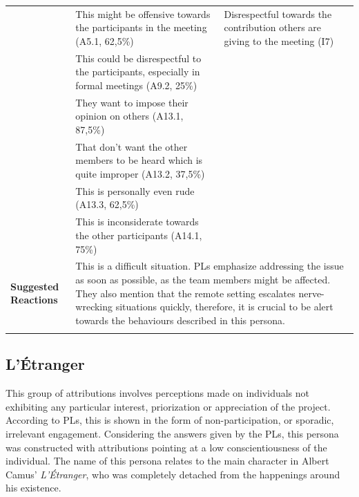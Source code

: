 \begin{longtable}[ht]{ p{}  p{} p{} }
     & This might be offensive towards the participants in the meeting (A5.1, 62,5\%) & Disrespectful towards the contribution others are giving to the meeting (I7) \\
     & This could be disrespectful to the participants, especially in formal meetings (A9.2, 25\%)  \\
 	 & They want to impose their opinion on others (A13.1, 87,5\%)   \\
 	 & That don't want the other members to be heard which is quite improper (A13.2, 37,5\%)\\
 	 & This is personally even rude (A13.3, 62,5\%) \\
 	 & This is inconsiderate towards the other participants (A14.1, 75\%) \\
    \hline 
 	 \textbf{Suggested Reactions} & \multicolumn{2}{p{.80\textwidth}}{This is a difficult situation. PLs emphasize addressing the issue as soon as possible, as the team members might be affected. They also mention that the remote setting escalates nerve-wrecking situations quickly, therefore, it is crucial to be alert towards the behaviours described in this persona.} \\
    \hline
\label{tab:multicol}
\end{longtable}

\subsection{L'Étranger}

This group of attributions involves perceptions made on individuals not exhibiting any particular interest, priorization or appreciation of the project. According to PLs, this is shown in the form of non-participation, or sporadic, irrelevant engagement. Considering the answers given by the PLs, this persona was constructed with attributions pointing at a low conscientiousness of the individual. The name of this persona relates to the main character in Albert Camus' \textit{L'Étranger}, who was completely detached from the happenings around his existence. 

